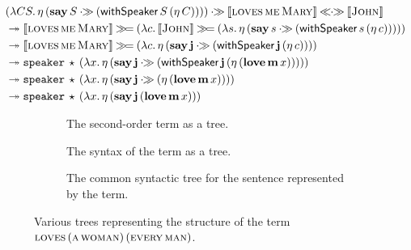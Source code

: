 \begin{align*}
&(\lam{C S}{\etaE{(\ap{\obj{say}}{S} \apr (\app{\withSpeaker}{S}{(\etaE{C})}))}})
  \apr \sem{\app{\abs{loves}}{\abs{me}}{\abs{Mary}}} \aplr \sem{\abs{John}} \\
&\tto \sem{\app{\abs{loves}}{\abs{me}}{\abs{Mary}}} \hsbind (\lam{c}{
  \sem{\abs{John}} \hsbind (\lam{s}{
  \etaE{(\ap{\obj{say}}{s} \apr (\app{\withSpeaker}{s}{(\etaE{c})}))}})}) \\
&\tto \sem{\app{\abs{loves}}{\abs{me}}{\abs{Mary}}} \hsbind (\lam{c}{
  \etaE{(\ap{\obj{say}}{\obj{j}} \apr (\app{\withSpeaker}{\obj{j}}{(\etaE{c})}))}}) \\
&\tto \app{\op{speaker}}{\star}{(\lam{x}{
   \etaE{(\ap{\obj{say}}{\obj{j}} \apr (\app{\withSpeaker}{\obj{j}}{(\etaE{(\app{\obj{love}}{\obj{m}}{x})})}))}})} \\
&\tto \app{\op{speaker}}{\star}{(\lam{x}{
   \etaE{(\ap{\obj{say}}{\obj{j}} \apr (\etaE{(\app{\obj{love}}{\obj{m}}{x})}))}})} \\
&\tto \app{\op{speaker}}{\star}{(\lam{x}{
   \etaE{(\app{\obj{say}}{\obj{j}}{(\app{\obj{love}}{\obj{m}}{x})})}})}
\end{align*}

\begin{figure}
  \begin{subfigure}[b]{.25\textwidth}
  \caption{\label{fig:second-order-tree} The second-order term as a tree.}
  \end{subfigure}
  \begin{subfigure}[b]{.49\textwidth}
  \caption{\label{fig:abstract-syntax-tree} The syntax of the term as a
    tree.}
  \end{subfigure}
  \begin{subfigure}[b]{.25\textwidth}
  \caption{\label{fig:common-syntax-tree} The common syntactic tree for the
    sentence represented by the term.}
  \end{subfigure}

  \caption{\label{fig:cbn-cbv-trees} Various trees representing the
    structure of the term
    $\textsc{loves}\,(\textsc{a}\,\textsc{woman})\,(\textsc{every}\,\textsc{man})$.}
\end{figure}


